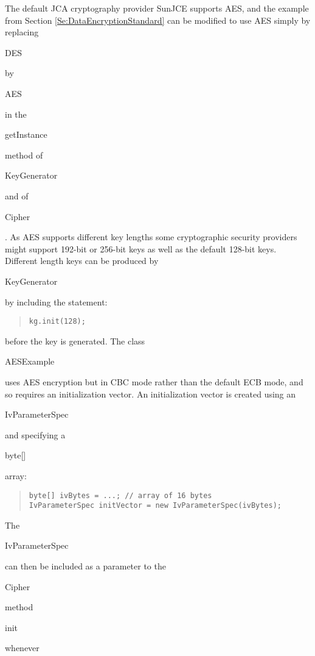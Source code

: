 The default JCA cryptography provider SunJCE supports AES, and the example from Section
\ref{Se:DataEncryptionStandard} can be modified to use AES simply by replacing
\begin{code}DES\end{code} by \begin{code}AES\end{code} in the
\begin{code}getInstance\end{code} method of \begin{code}KeyGenerator\end{code}
and of \begin{code}Cipher\end{code}.
As AES supports different key lengths some cryptographic security providers
might support 192-bit or 256-bit keys as well as the default 128-bit keys.
Different length keys can be produced by \begin{code}KeyGenerator\end{code}
by including the statement:
\begin{quote}\begin{code}\begin{verbatim}
kg.init(128);
\end{verbatim}\end{code}\end{quote}
before the key is generated.
The class \begin{code}AESExample\end{code} uses AES encryption
but in CBC mode rather than the default ECB mode, and so
requires an initialization vector.
An initialization vector is created using an \begin{code}IvParameterSpec\end{code}
and specifying a \begin{code}byte[]\end{code} array:
\begin{quote}\begin{code}\begin{verbatim}
byte[] ivBytes = ...; // array of 16 bytes
IvParameterSpec initVector = new IvParameterSpec(ivBytes);
\end{verbatim}\end{code}\end{quote}
The \begin{code}IvParameterSpec\end{code} can then be included as a parameter
to the \begin{code}Cipher\end{code} method \begin{code}init\end{code} whenever
